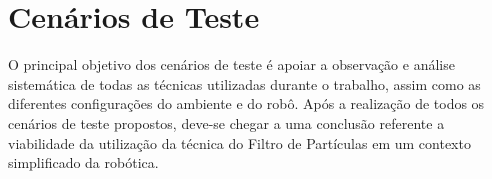\chapter[Cenários de Teste]{Cenários de Teste}
\label{sec:cenarios_teste}
O principal objetivo dos cenários de teste é apoiar a observação e análise sistemática de todas as técnicas utilizadas durante o trabalho, assim como as diferentes configurações do ambiente e do robô. Após a realização de todos os cenários de teste propostos, deve-se chegar a uma conclusão referente a viabilidade da utilização da técnica do Filtro de Partículas em um contexto simplificado da robótica. 


